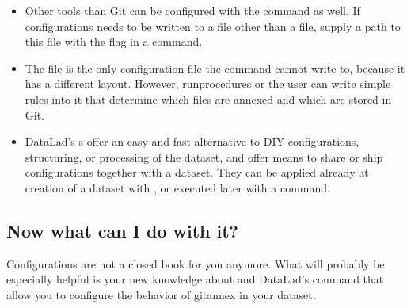\begin{itemize}
\item {} 
\sphinxAtStartPar
Other tools than Git can be configured with the  command
as well. If configurations needs to be written to a file other than a
 file, supply a path to this file with the  flag
in a  command.

\item {} 
\sphinxAtStartPar
The  file is the only configuration file the 
command cannot write to, because it has a different layout. However, run\sphinxhyphen{}procedures or
the user can write simple rules into it that determine which files are annexed
and which are stored in Git.

\item {} 
\sphinxAtStartPar
DataLad’s s offer an easy and fast alternative to DIY
configurations, structuring, or processing of the dataset, and offer means to share or ship configurations together with a dataset.
They can be applied already at creation of a dataset with ,
or executed later with a  command.

\end{itemize}


\subsection{Now what can I do with it?}
\label{\detokenize{basics/101-125-summary:now-what-can-i-do-with-it}}
\sphinxAtStartPar
Configurations are not a closed book for you anymore. What will probably be
especially helpful is your new knowledge about  and
DataLad’s  command that allow you to configure the behavior
of git\sphinxhyphen{}annex in your dataset.

\sphinxstepscope



